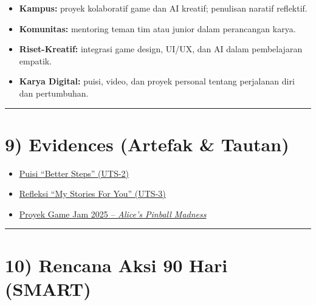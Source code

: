\documentclass[
  letterpaper,
  DIV=11,
  numbers=noendperiod]{scrreprt}
\providecommand{\tightlist}{%
  \setlength{\itemsep}{0pt}\setlength{\parskip}{0pt}}
\begin{document}
\begin{itemize}
\tightlist
\item
  \textbf{Kampus:} proyek kolaboratif game dan AI kreatif; penulisan
  naratif reflektif.\\
\item
  \textbf{Komunitas:} mentoring teman tim atau junior dalam perancangan
  karya.\\
\item
  \textbf{Riset-Kreatif:} integrasi game design, UI/UX, dan AI dalam
  pembelajaran empatik.\\
\item
  \textbf{Karya Digital:} puisi, video, dan proyek personal tentang
  perjalanan diri dan pertumbuhan.
\end{itemize}

\begin{center}\rule{0.5\linewidth}{0.5pt}\end{center}

\section{9) Evidences (Artefak \&
Tautan)}\label{evidences-artefak-tautan}

\begin{itemize}
\tightlist
\item[$\square$]
  \hyperref[uts-2-my-songs-for-you]{Puisi ``Better Steps'' (UTS-2)}\\
\item[$\square$]
  \hyperref[uts-3-my-stories-for-you]{Refleksi ``My Stories For You''
  (UTS-3)}\\
\item[$\square$]
  \href{https://loxenary.itch.io/148-selamat-kepada-tim-student-alices-pinball-madness}{Proyek
  Game Jam 2025 -- \emph{Alice's Pinball Madness}}
\end{itemize}

\begin{center}\rule{0.5\linewidth}{0.5pt}\end{center}

\section{10) Rencana Aksi 90 Hari
(SMART)}\label{rencana-aksi-90-hari-smart}
\end{document}
